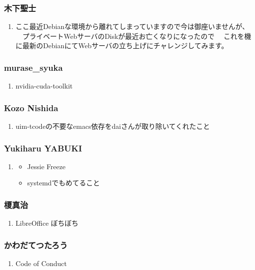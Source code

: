 \documentclass[cjk,dvipdfmx,10pt,compress,%
hyperref={bookmarks=true,bookmarksnumbered=true,bookmarksopen=false,%
colorlinks=false,%
pdftitle={第 92 回 関西 Debian 勉強会},%
pdfauthor={倉敷・のがた・佐々木・かわだ},%
pdfsubject={資料},%
}]{beamer}
\begin{document}
\begin{frame}
  \frametitle{ 木下聖士 }
  \begin{enumerate}
  \item ここ最近Debianな環境から離れてしまっていますので今は御座いませんが、
    　プライベートWebサーバのDiskが最近お亡くなりになったので
    　これを機に最新のDebianにてWebサーバの立ち上げにチャレンジしてみます。
  \end{enumerate}
\end{frame}

\begin{frame}
  \frametitle{ murase\_syuka }
  \begin{enumerate}
  \item nvidia-cuda-toolkit
  \end{enumerate}
\end{frame}

\begin{frame}
  \frametitle{ Kozo Nishida }
  \begin{enumerate}
  \item uim-tcodeの不要なemacs依存をdaiさんが取り除いてくれたこと
  \end{enumerate}
\end{frame}

\begin{frame}
  \frametitle{ Yukiharu YABUKI }
  \begin{enumerate}
  \item
    \begin{itemize}
    \item Jessie Freeze
    \item systemdでもめてること
    \end{itemize}
  \end{enumerate}
\end{frame}

\begin{frame}
  \frametitle{ 榎真治 }
  \begin{enumerate}
  \item LibreOffice ぼちぼち
  \end{enumerate}
\end{frame}

\begin{frame}
  \frametitle{ かわだてつたろう }
  \begin{enumerate}
  \item Code of Conduct
  \end{enumerate}
\end{frame}
\end{document}
